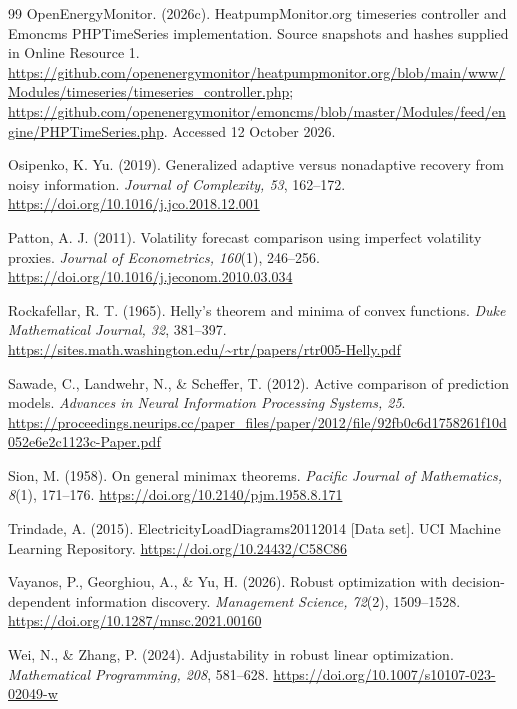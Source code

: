 \documentclass[12pt]{article}
\begin{document}
\begin{thebibliography}{99}
OpenEnergyMonitor. (2026c). HeatpumpMonitor.org timeseries controller and
Emoncms PHPTimeSeries implementation. Source snapshots and hashes supplied
in Online Resource 1.
\url{https://github.com/openenergymonitor/heatpumpmonitor.org/blob/main/www/Modules/timeseries/timeseries_controller.php};
\url{https://github.com/openenergymonitor/emoncms/blob/master/Modules/feed/engine/PHPTimeSeries.php}.
Accessed 12 October 2026.

Osipenko, K. Yu. (2019). Generalized adaptive versus nonadaptive recovery
from noisy information. \emph{Journal of Complexity, 53}, 162--172.
\url{https://doi.org/10.1016/j.jco.2018.12.001}

Patton, A. J. (2011). Volatility forecast comparison using imperfect
volatility proxies. \emph{Journal of Econometrics, 160}(1), 246--256.
\url{https://doi.org/10.1016/j.jeconom.2010.03.034}

Rockafellar, R. T. (1965). Helly's theorem and minima of convex functions.
\emph{Duke Mathematical Journal, 32}, 381--397.
\url{https://sites.math.washington.edu/~rtr/papers/rtr005-Helly.pdf}

Sawade, C., Landwehr, N., \& Scheffer, T. (2012).
Active comparison of prediction models.
\emph{Advances in Neural Information Processing Systems, 25}.
\url{https://proceedings.neurips.cc/paper_files/paper/2012/file/92fb0c6d1758261f10d052e6e2c1123c-Paper.pdf}

Sion, M. (1958). On general minimax theorems.
\emph{Pacific Journal of Mathematics, 8}(1), 171--176.
\url{https://doi.org/10.2140/pjm.1958.8.171}

Trindade, A. (2015). ElectricityLoadDiagrams20112014 [Data set].
UCI Machine Learning Repository.
\url{https://doi.org/10.24432/C58C86}

Vayanos, P., Georghiou, A., \& Yu, H. (2026).
Robust optimization with decision-dependent information discovery.
\emph{Management Science, 72}(2), 1509--1528.
\url{https://doi.org/10.1287/mnsc.2021.00160}

Wei, N., \& Zhang, P. (2024). Adjustability in robust linear optimization.
\emph{Mathematical Programming, 208}, 581--628.
\url{https://doi.org/10.1007/s10107-023-02049-w}
\end{thebibliography}
\end{document}
